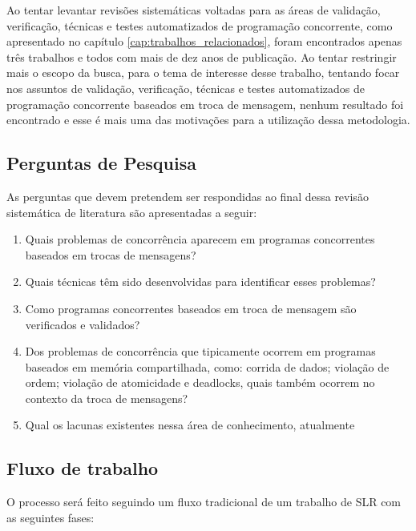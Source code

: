 Ao tentar levantar revisões sistemáticas voltadas para as áreas de validação, verificação, técnicas e testes automatizados de programação concorrente, como apresentado no capítulo  \ref{cap:trabalhos_relacionados}, foram encontrados apenas três trabalhos e todos com mais de dez anos de publicação. Ao tentar restringir mais o escopo da busca, para o tema de interesse desse trabalho, tentando focar nos assuntos de validação, verificação, técnicas e testes automatizados de programação concorrente baseados em troca de mensagem, nenhum resultado foi encontrado e esse é mais uma das motivações para a utilização dessa metodologia.

\subsection{Perguntas de Pesquisa} \label{subsec:pergutasPesquisa}

As perguntas que devem pretendem ser respondidas ao final dessa revisão sistemática de literatura são apresentadas a seguir:

\begin{enumerate}
    \item Quais problemas de concorrência aparecem em programas concorrentes baseados em trocas de mensagens?
    \item Quais técnicas têm sido desenvolvidas para identificar esses problemas?
    \item Como programas concorrentes baseados em troca de mensagem são verificados e validados?
    \item Dos problemas de concorrência que tipicamente ocorrem em programas baseados em memória compartilhada, como: corrida de dados; violação de ordem; violação de atomicidade e deadlocks, quais também ocorrem no contexto da troca de mensagens?
    \item Qual os lacunas existentes nessa área de conhecimento, atualmente
\end{enumerate}

\subsection{Fluxo de trabalho} \label{subsec:fluxoTrabalho}

O processo será feito seguindo um fluxo tradicional de um trabalho de SLR com as seguintes fases:

